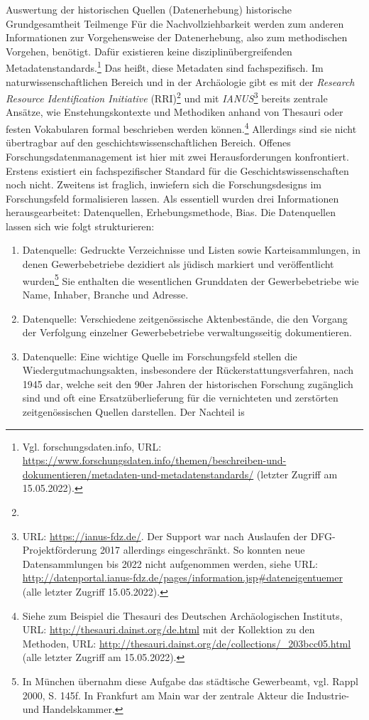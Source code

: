 Auswertung der historischen Quellen (Datenerhebung)
historische Grundgesamtheit Teilmenge
Für die Nachvollziehbarkeit werden zum anderen Informationen zur Vorgehensweise der Datenerhebung, also zum methodischen Vorgehen, benötigt. Dafür existieren keine disziplinübergreifenden Metadatenstandards.\footnote{Vgl. forschungsdaten.info, URL: \url{https://www.forschungsdaten.info/themen/beschreiben-und-dokumentieren/metadaten-und-metadatenstandards/} (letzter Zugriff am 15.05.2022).} Das heißt, diese Metadaten sind fachspezifisch. Im naturwissenschaftlichen Bereich und in der Archäologie gibt es mit der \textit{Research Resource Identification Initiative} (RRI)\footnote{} und mit \textit{IANUS}\footnote{URL: \url{https://ianus-fdz.de/}. Der Support war nach Auslaufen der DFG-Projektförderung 2017 allerdings eingeschränkt. So konnten neue Datensammlungen bis 2022 nicht aufgenommen werden, siehe URL: \url{http://datenportal.ianus-fdz.de/pages/information.jsp\#dateneigentuemer} (alle letzter Zugriff 15.05.2022).} bereits zentrale Ansätze, wie Enstehungskontexte und Methodiken anhand von Thesauri oder festen Vokabularen formal beschrieben werden können.\footnote{Siehe zum Beispiel die Thesauri des Deutschen Archäologischen Instituts, URL: \url{http://thesauri.dainst.org/de.html} mit der Kollektion zu den Methoden, URL: \url{http://thesauri.dainst.org/de/collections/\_203bcc05.html} (alle letzter Zugriff am 15.05.2022).} Allerdings sind sie nicht übertragbar auf den geschichtswissenschaftlichen Bereich. Offenes Forschungsdatenmanagement ist hier mit zwei Herausforderungen konfrontiert. Erstens existiert ein fachspezifischer Standard für die Geschichtswissenschaften noch nicht. Zweitens ist fraglich, inwiefern sich die Forschungsdesigns im Forschungsfeld formalisieren lassen. Als essentiell wurden drei Informationen herausgearbeitet: Datenquellen, Erhebungsmethode, Bias. Die Datenquellen lassen sich wie folgt strukturieren:

\begin{enumerate}
    \item Datenquelle: Gedruckte Verzeichnisse und Listen sowie Karteisammlungen, in denen Gewerbebetriebe dezidiert als jüdisch markiert und veröffentlicht wurden\footnote{In München übernahm diese Aufgabe das städtische Gewerbeamt, vgl. Rappl 2000, S. 145f. In Frankfurt am Main war der zentrale Akteur die Industrie- und Handelskammer.} Sie enthalten die wesentlichen Grunddaten der Gewerbebetriebe wie Name, Inhaber, Branche und Adresse.
    \item Datenquelle: Verschiedene zeitgenössische Aktenbestände, die den Vorgang der Verfolgung einzelner Gewerbebetriebe verwaltungsseitig dokumentieren. 
    \item Datenquelle: Eine wichtige Quelle im Forschungsfeld stellen die Wiedergutmachungsakten, insbesondere der Rückerstattungsverfahren, nach 1945 dar, welche seit den 90er Jahren der historischen Forschung zugänglich sind und oft eine Ersatzüberlieferung für die vernichteten und zerstörten zeitgenössischen Quellen darstellen. Der Nachteil is     
\end{enumerate}

